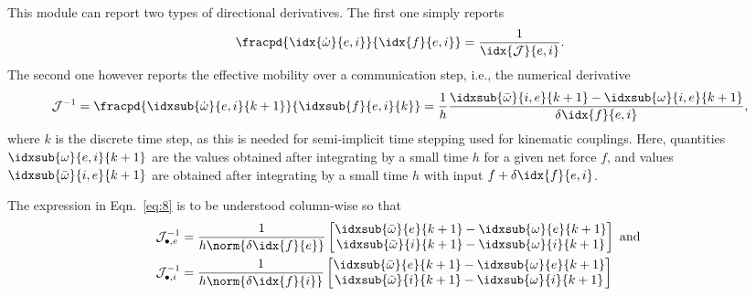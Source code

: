 \documentclass[10pt,notitlepage,abstracton]{scrartcl}
\theoremstyle{plain}
\theoremstyle{plain}
\theoremstyle{plain}
\begin{document}
This module can report two types of directional derivatives.  The first one
simply reports
\begin{equation}
  \label{eq:7}
  \fracpd{\idx{\dot{\omega}}{e,i}}{\idx{f}{e,i}} =
  \frac{1}{\idx{\mathcal{J}}{e,i}}. 
\end{equation}
The second one however reports the effective mobility over a communication
step, i.e., the numerical derivative 
\begin{equation}
  \label{eq:8}
  \mathcal{J}^{-1} = \fracpd{\idxsub{\dot{\omega}}{e,i}{k+1}}{\idxsub{f}{e,i}{k}} =
  \frac{1}{h}\frac{
    \idxsub{\bar{\omega}}{i,e}{k+1} -\idxsub{{\omega}}{i,e}{k+1}
  }{\delta \idx{f}{e,i}}, 
\end{equation}
where $k$ is the discrete time step, as this is needed for semi-implicit
time stepping used for kinematic couplings.  Here, quantities
$\idxsub{\omega}{e,i}{k+1}$ are the values obtained after integrating by a
small time $h$ for a given net force $f$, and values
$\idxsub{\bar{\omega}}{i,e}{k+1}$ are obtained after integrating by a small
time $h$ with input $f + \delta \idx{f}{e,i}$.  

The expression in Eqn.~\eqref{eq:8} is to be understood column-wise so that
\begin{equation}
  \label{eq:3}
  \begin{split}
    \mathcal{J}^{-1}_{{\bullet,e}} &= \frac{1}{h\norm{\delta \idx{f}{e}}}
    \begin{bmatrix}
      \idxsub{\bar{\omega}}{e}{k+1} -\idxsub{{\omega}}{e}{k+1} \\
      \idxsub{\bar{\omega}}{i}{k+1} -\idxsub{{\omega}}{i}{k+1} 
    \end{bmatrix}  
    \text{ and } \\
    \mathcal{J}^{-1}_{{\bullet,i}} &= \frac{1}{h\norm{\delta \idx{f}{i}}}
    \begin{bmatrix}
      \idxsub{\bar{\omega}}{e}{k+1} -\idxsub{{\omega}}{e}{k+1} \\
      \idxsub{\bar{\omega}}{i}{k+1} -\idxsub{{\omega}}{i}{k+1} 
    \end{bmatrix}  
  \end{split}
\end{equation}
\end{document}
